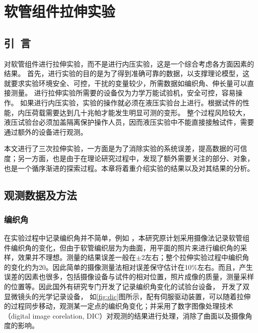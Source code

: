 
\chapter{软管组件拉伸实验}
\section{引~言}
对软管组件进行拉伸实验，而不是进行内压实验，这是一个综合考虑各方面因素的结果。
首先，进行实验的目的是为了得到准确可靠的数据，以支撑理论模型，这就要求实验环境安全、可控，干扰的变量较少，所需数据如编织角、伸长量可以直接测量。
进行拉伸实验所需要的设备仅为力学万能试验机，安全可控，容易操作。
如果进行内压实验，实验的操作就必须在液压实验台上进行。根据试件的性能，内压荷载需要达到几十兆帕才能发生明显可测的变形。
整个过程风险较大，液压试验台必须加盖隔离保护操作人员，因而液压实验中不能直接接触试件，需要通过额外的设备进行观测。

本文进行了三次拉伸实验，一方面是为了消除实验的系统误差，提高数据的可信度；另一方面，也是由于在理论研究过程中，发现了额外需要关注的部分、对象，也是一个循序渐进的探索过程。本章将着重介绍实验的结果以及对其结果的分析。
\section{观测数据及方法}


\subsection{编织角}
在实验过程中记录编织角并不简单，例如 ，本研究原计划采用摄像法记录软管组件编织角的变化，但由于软管编织层为为曲面，用平面的照片来进行编织角的采样，效果并不理想。测量的结果误差一般在$ \pm $2\textdegree 左右；整个拉伸实验过程中编织角的变化约为20\textdegree 。因此简单的摄像测量法相对误差保守估计在10\%左右。而且，产生误差的因素也很多，包括摄像设备与试件的相对位置，照片成像的质量，测量采样的位置等。因此国外有研究专门开发了记录编织角变化的试验台设备， \citeauthor{Leung2013}\cite{Leung2013}开发了双显微镜头的光学记录设备，
如\ref{fig:dic}图所示，配有伺服驱动装置，可以随着拉伸的过程同步移动，观测某一定点的编织角变化；并采用了数字图像处理技术（digital image corelation, DIC）对观测的结果进行处理，消除了曲面以及摄像角度的影响。

